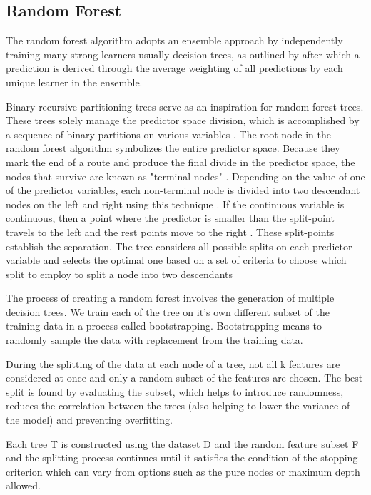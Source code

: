 \documentclass[12pt, a4paper,twoside]{report}
\numberwithin{equation}{chapter}
\begin{document}
\subsection{Random Forest}
The random forest algorithm adopts an ensemble approach by independently training many strong learners usually decision trees, as outlined by \parencite{Toprak_2021} after which a prediction is derived through the average weighting of all predictions \parencite{AnalytixLabs_2023} by each unique learner in the ensemble.

Binary recursive partitioning trees serve as an inspiration for random forest trees. These trees solely manage the predictor space division, which is accomplished by a sequence of binary partitions on various variables \parencite{zappone-2019}. The root node in the random forest algorithm symbolizes the entire predictor space. Because they mark the end of a route and produce the final divide in the predictor space, the nodes that survive are known as "terminal nodes" \parencite{zhu-2023}. Depending on the value of one of the predictor variables, each non-terminal node is divided into two descendant nodes on the left and right using this technique \parencite{gupta-2015}. If the continuous variable is continuous, then a point where the predictor is smaller than the split-point travels to the left and the rest points move to the right \parencite{cadena-2016}. These split-points establish the separation. The tree considers all possible splits on each predictor variable and selects the optimal one based on a set of criteria to choose which split to employ to split a node into two descendants \parencite{jena-2020}\

The process of creating a random forest involves the generation of multiple decision trees. We train each of the tree on it's own different subset of the training data in a process called bootstrapping. Bootstrapping means to randomly sample the data with replacement from the training data.

During the splitting of the data at each node of a tree, not all k features are considered at once and only a random subset of the features are chosen. The best split is found by evaluating the subset, which helps to introduce randomness, reduces the correlation between the trees (also helping to lower the variance of the model) and preventing overfitting.

Each tree T is constructed using the dataset D and the random feature subset F and the splitting process continues until it satisfies the condition of the stopping criterion which can vary from options such as the pure nodes or maximum depth allowed.
\end{document}
